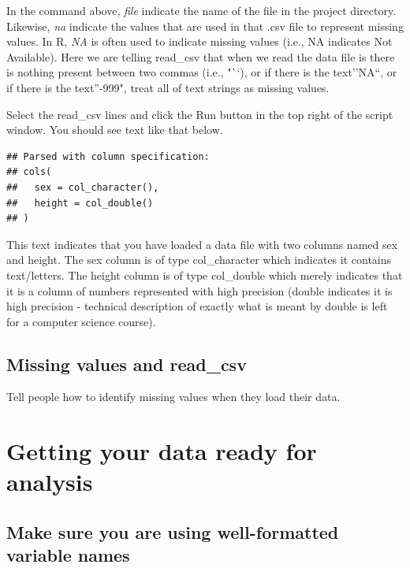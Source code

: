 \documentclass[
]{krantz}
\begin{document}
In the command above, \emph{file} indicate the name of the file in the project directory. Likewise, \emph{na} indicate the values that are used in that .csv file to represent missing values. In R, \emph{NA} is often used to indicate missing values (i.e., NA indicates Not Available). Here we are telling read\_csv that when we read the data file is there is nothing present between two commas (i.e., "``), or if there is the text''NA``, or if there is the text''-999", treat all of text strings as missing values.

Select the read\_csv lines and click the Run button in the top right of the script window. You should see text like that below.

\begin{verbatim}
## Parsed with column specification:
## cols(
##   sex = col_character(),
##   height = col_double()
## )
\end{verbatim}

This text indicates that you have loaded a data file with two columns named sex and height. The sex column is of type col\_character which indicates it contains text/letters. The height column is of type col\_double which merely indicates that it is a column of numbers represented with high precision (double indicates it is high precision - technical description of exactly what is meant by double is left for a computer science course).

\hypertarget{missing-values-and-read_csv}{%
\subsection{Missing values and read\_csv}\label{missing-values-and-read_csv}}

Tell people how to identify missing values when they load their data.

\hypertarget{getting-your-data-ready-for-analysis}{%
\section{Getting your data ready for analysis}\label{getting-your-data-ready-for-analysis}}

\hypertarget{make-sure-you-are-using-well-formatted-variable-names}{%
\subsection{Make sure you are using well-formatted variable names}\label{make-sure-you-are-using-well-formatted-variable-names}}
\end{document}
